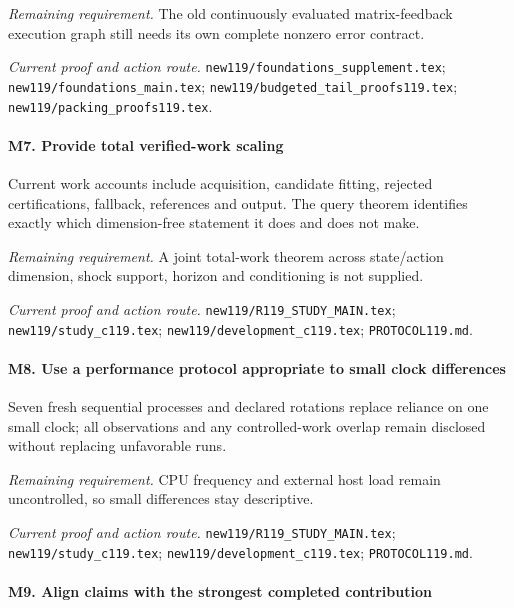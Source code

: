 \par\emph{Remaining requirement.} The old continuously evaluated matrix-feedback execution graph still needs its own complete nonzero error contract.

\par\emph{Current proof and action route.} \nolinkurl{new119/foundations_supplement.tex}; \nolinkurl{new119/foundations_main.tex}; \nolinkurl{new119/budgeted_tail_proofs119.tex}; \nolinkurl{new119/packing_proofs119.tex}.

\paragraph{M7. Provide total verified-work scaling}

Current work accounts include acquisition, candidate fitting, rejected certifications, fallback, references and output. The query theorem identifies exactly which dimension-free statement it does and does not make.

\par\emph{Remaining requirement.} A joint total-work theorem across state/\allowbreak{}action dimension, shock support, horizon and conditioning is not supplied.

\par\emph{Current proof and action route.} \nolinkurl{new119/R119_STUDY_MAIN.tex}; \nolinkurl{new119/study_c119.tex}; \nolinkurl{new119/development_c119.tex}; \nolinkurl{PROTOCOL119.md}.

\paragraph{M8. Use a performance protocol appropriate to small clock differences}

Seven fresh sequential processes and declared rotations replace reliance on one small clock; all observations and any controlled-work overlap remain disclosed without replacing unfavorable runs.

\par\emph{Remaining requirement.} CPU frequency and external host load remain uncontrolled, so small differences stay descriptive.

\par\emph{Current proof and action route.} \nolinkurl{new119/R119_STUDY_MAIN.tex}; \nolinkurl{new119/study_c119.tex}; \nolinkurl{new119/development_c119.tex}; \nolinkurl{PROTOCOL119.md}.

\paragraph{M9. Align claims with the strongest completed contribution}

